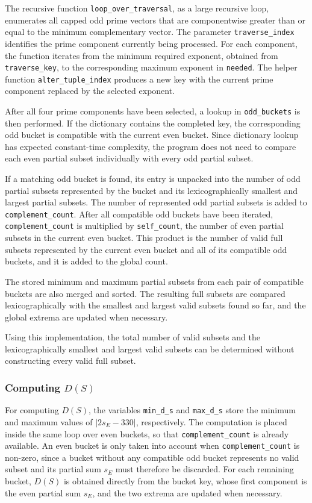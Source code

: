 \documentclass[11pt,a4paper]{article}
\begin{document}
The recursive function \texttt{loop\_over\_traversal}, as a large recursive loop, enumerates all capped odd prime vectors that are componentwise greater than or equal to the minimum complementary vector. The parameter \texttt{traverse\_index} identifies the prime component currently being processed. For each component, the function iterates from the minimum required exponent, obtained from \texttt{traverse\_key}, to the corresponding maximum exponent in \texttt{needed}. The helper function \texttt{alter\_tuple\_index} produces a new key with the current prime component replaced by the selected exponent.

After all four prime components have been selected, a lookup in \texttt{odd\_buckets} is then performed. If the dictionary contains the completed key, the corresponding odd bucket is compatible with the current even bucket.
Since dictionary lookup has expected constant-time complexity, the program does not need to compare each even partial subset individually with every odd partial subset.

If a matching odd bucket is found, its entry is unpacked into the number of odd partial subsets represented by the bucket and its lexicographically smallest and largest partial subsets. The number of represented odd partial subsets is added to \texttt{complement\_count}. After all compatible odd buckets have been iterated, \texttt{complement\_count} is multiplied by \texttt{self\_count}, the number of even partial subsets in the current even bucket. This product is the number of valid full subsets represented by the current even bucket and all of its compatible odd buckets, and it is added to the global count.

The stored minimum and maximum partial subsets from each pair of compatible buckets are also merged and sorted. The resulting full subsets are compared lexicographically with the smallest and largest valid subsets found so far, and the global extrema are updated when necessary.

Using this implementation, the total number of valid subsets and the lexicographically smallest and largest valid subsets can be determined without constructing every valid full subset.

\subsubsection*{Computing \(D(S)\)}

For computing $D(S)$, the variables \texttt{min\_d\_s} and \texttt{max\_d\_s} store the minimum and maximum values of $|2s_E-330|$, respectively. The computation is placed inside the same loop over even buckets, so that \texttt{complement\_count} is already available. An even bucket is only taken into account when \texttt{complement\_count} is non-zero, since a bucket without any compatible odd bucket represents no valid subset and its partial sum $s_E$ must therefore be discarded. For each remaining bucket, $D(S)$ is obtained directly from the bucket key, whose first component is the even partial sum $s_E$, and the two extrema are updated when necessary.
\end{document}
